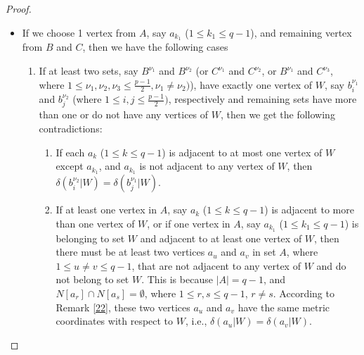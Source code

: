 \documentclass[10pt,a4paper]{amsart}
\begin{document}
\begin{proof}
\begin{enumerate}
\begin{itemize}
\begin{enumerate}
\begin{enumerate}
 $\delta(a_{u}|W) =\delta(a_{v}|W)$.
    \end{enumerate}
    \item \label{item 9} If only one set, say \( B^{\nu_1} \) (or \( C^{\nu_2} \)), where \( 1 \leq \nu_1, \nu_2 \leq \frac{p-1}{2} \), contains one vertex of  \( W \), say \( b^{\nu_1}_i \), while the remaining sets contain either more than one or do not have any vertices of  \( W \), then there exist at least two sets do not contain any vertex of $W$, which we will denote by $B^{\nu_3}$ and $B^{\nu_4}$ (where $\nu_3 \neq \nu_4$). This is because $W$ has $q-2$ vertices, and $q-2<2p-4$, and also 2 vertices of $W$ are chosen in $A$. Therefore, From Remark \ref{last} $\delta(q_i|W) = \delta(q_j|W)$, where $q_i$ and $q_j$ are adjacent to vertices of $B^{\nu_3}$ and $B^{\nu_4}$ respectively.
 \item If all sets $B^{\nu_i}$ and $C^{\nu_j}$ (where $1\leq i,j \leq \frac{p-1}{2})$ either contain more than one vertex of $W$ or do not contain any vertex of $W$, then we arrive at the same contradiction mentioned in the previous case \ref{item 9}. 
   \end{enumerate} 
    \item If we choose 1 vertex from $A$, say $a_{k_1}$ ($1\leq k_1 \leq q-1$), and remaining vertex from $B$ and $C$, then we have the following cases
    \begin{enumerate}
        \item If at least two sets, say $B^{\nu_1}$ and $B^{\nu_2}$ (or $C^{\nu_1}$ and $C^{\nu_2}$, or $B^{\nu_1}$ and $C^{\nu_3}$, where $1\leq \nu_1,\nu_2,\nu_3 \leq \frac{p-1}{2}, \nu_1\neq \nu_2)$), have exactly one vertex of $W$, say $b^{\nu_1}_i$ and $b^{\nu_2}_j$ (where $1\leq i,j \leq \frac{p-1}{2})$, respectively and remaining sets have more than one or do not have any vertices of $W$, then we get the following contradictions:
         \begin{enumerate}
        \item If each $a_k$ ($1\leq k \leq q-1$) is adjacent to at most one vertex of $W$ except $a_{k_1}$, and $a_{k_1}$ is not adjacent to any vertex of $W$, then $\delta( b^{\nu_2}_i|W) =\delta( b^{\nu_1}_{j}|W)$.
        \item If at least one vertex in $A$, say $a_k$ ($1\leq k \leq q-1$) is adjacent to more than one vertex of $W$, or if one vertex in $A$, say $a_{k_1}$ ($1\leq k_1 \leq q-1$) is belonging to set $W$ and adjacent to at least one vertex of $W$, then there must be at least two vertices $a_u$ and $a_v$ in set $A$, where $1 \leq u \neq v \leq q-1$, that are not adjacent to any vertex of $W$ and do not belong to set $W$. This is because $|A|=q-1$, and $N[a_r]\cap N[a_s]=\emptyset$, where $1\leq r,s\leq q-1$, $r\neq s$. According to Remark \ref{22}, these two vertices $a_u$ and $a_v$ have the same metric coordinates with respect to $W$, i.e., $\delta(a_u|W) = \delta(a_v|W)$.

\end{enumerate}
\end{enumerate}
\end{itemize}
\end{enumerate}
\end{proof}
\end{document}
